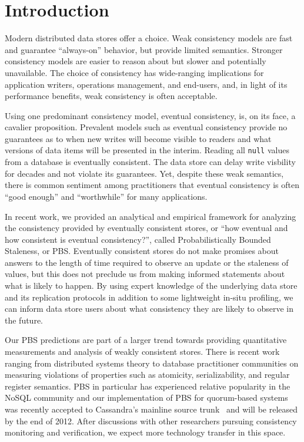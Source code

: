 \section{Introduction}

Modern distributed data stores offer a choice. Weak consistency models
are fast and guarantee ``always-on'' behavior, but provide limited
semantics. Stronger consistency models are easier to reason about but
slower and potentially unavailable. The choice of consistency has
wide-ranging implications for application writers, operations
management, and end-users, and, in light of its performance benefits,
weak consistency is often acceptable.

Using one predominant consistency model, eventual consistency, is, on
its face, a cavalier proposition. Prevalent models such as eventual
consistency provide no guarantees as to when new writes will become
visible to readers and what versions of data items will be presented
in the interim. Reading all \texttt{null} values from a database is
eventually consistent. The data store can delay write visbility for
decades and not violate its guarantees. Yet, despite these weak
semantics, there is common sentiment among practitioners that eventual
consistency is often ``good enough'' and ``worthwhile'' for many
applications.

In recent work, we provided an analytical and empirical framework for
analyzing the consistency provided by eventually consistent stores, or
``how eventual and how consistent is eventual consistency?'', called
Probabilistically Bounded Staleness, or PBS. Eventually consistent
stores do not make promises about answers to the length of time
required to observe an update or the staleness of values, but this
does not preclude us from making informed statements about what is
likely to happen. By using expert knowledge of the underlying data
store and its replication protocols in addition to some lightweight
in-situ profiling, we can inform data store users about what
consistency they are likely to observe in the future.

Our PBS predictions are part of a larger trend towards providing
quantitative measurements and analysis of weakly consistent
stores. There is recent work ranging from distributed systems theory
to database practitioner communities on measuring violations of
properties such as atomicity, serializability, and regular register
semantics. PBS in particular has experienced relative popularity in
the NoSQL community and our implementation of PBS for quorum-based
systems was recently accepted to Cassandra's mainline source
trunk~\cite{cassandra-pbs-patch} and will be released by the end 
of 2012. After discussions with other researchers pursuing consistency 
monitoring and verification, we expect more technology transfer in 
this space.

